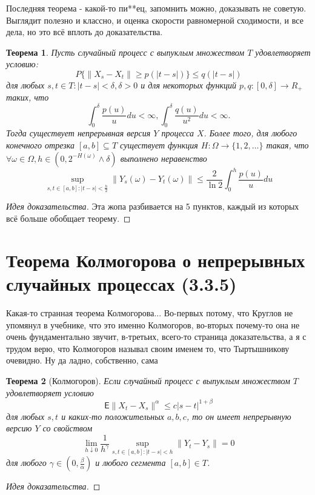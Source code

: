 \documentclass[16pt]{article}
\newtheorem{theorem}{Теорема}[section]
\theoremstyle{definition}
\begin{document}
Последняя теорема - какой-то пи**ец, запомнить можно, доказывать не советую. Выглядит полезно и классно, и оценка скорости равномерной сходимости, и все дела, но это всё вплоть до доказательства.
\begin{theorem}
Пусть случайный процесс с выпуклым множеством $T$ удовлетворяет условию: $$P\{\|X_s - X_t\| \ge p(|t - s|)\} \le q(|t - s|)$$ для любых $s, t \in T : |t - s| < \delta, \delta > 0$ и для некоторых функций $p,q: [0, \delta] \rightarrow R_+$ таких, что $$\int_0^\delta \frac{p(u)}{u} du < \infty, \int_0^\delta \frac{q(u)}{u^2} du < \infty.$$ Тогда существует непрерывная версия $Y$ процесса $X$. Более того, для любого конечного отрезка $[a, b] \subseteq T$ существует функция $H: \Omega \rightarrow \{1, 2, \ldots\}$ такая, что $\forall \omega \in \Omega, h \in (0, 2^{-H(\omega)} \wedge \delta)$ выполнено неравенство $$\sup_{s, t \in [a, b]: |t - s| < \frac{h}{2}} \|Y_s(\omega) - Y_t(\omega)\| \le \frac{2}{\ln 2} \int_0^h \frac{p(u)}{u} du$$
\end{theorem}
\begin{proof}[Идея доказательства]
Эта жопа разбивается на 5 пунктов, каждый из которых всё больше обобщает теорему.
\end{proof}

\section{Теорема Колмогорова о непрерывных случайных процессах (3.3.5)}
Какая-то странная теорема Колмогорова... Во-первых потому, что Круглов не упомянул в учебнике, что это именно Колмогоров, во-вторых почему-то она не очень фундаментально звучит, в-третьих, всего-то страница доказательства, а я с трудом верю, что Колмогоров называл своим именем то, что Тыртышникову очевидно. Ну да ладно, собственно, сама
\begin{theorem}[Колмогоров]
Если случайный процесс с выпуклым множеством $T$ удовлетворяет условию $$\mathsf{E} \|X_t - X_s\|^\alpha \le c|s - t|^{1 + \beta}$$ для любых $s, t$ и каких-то положительных $a, b, c$, то он имеет непрерывную версию $Y$ со свойством $$\lim_{h \downarrow 0}\frac{1}{h^\gamma}\sup_{s, t \in [a, b]: |t - s| < h} \|Y_t - Y_s\| = 0$$ для любого $\gamma \in (0, \frac{\beta}{\alpha})$ и любого сегмента $[a, b] \in T$.
\end{theorem}
\begin{proof}[Идея доказательства]

\end{proof}
\end{document}
